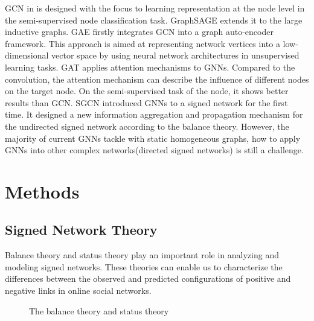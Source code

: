 \documentclass[runningheads]{llncs}
\begin{document}
GCN in\cite{kipf2016semi} is designed with the focus to learning representation at the node level in the semi-supervised node classification task. 
GraphSAGE\cite{hamilton2017inductive} extends it to the large inductive graphs.
GAE\cite{kipf2016variational} firstly integrates GCN into a graph auto-encoder framework. 
This approach is aimed at representing network vertices into a low-dimensional vector space by using neural network architectures in unsupervised learning tasks.
GAT\cite{velickovic2017graph} applies attention mechanisms to GNNs. 
Compared to the convolution, the attention mechanism can describe the influence of different nodes on the target node. 
On the semi-supervised task of the node, it shows better results than GCN.
SGCN\cite{arinik2017signed} introduced GNNs to a signed network for the first time. 
It designed a new information aggregation and propagation mechanism for the undirected signed network according to the balance theory. 
However, the majority of current GNNs tackle with static homogeneous graphs\cite{wu2019comprehensive}, how to apply GNNs into other complex networks(\eg directed signed networks) is still a challenge. 

 
\section{Methods}\label{sec:methods}
\subsection{Signed Network Theory}

Balance theory and status theory play an important role in analyzing and modeling signed networks. 
These theories can enable us to characterize the differences between the observed and predicted configurations of positive and negative links in online social networks\cite{leskovec2010predicting}. 
\begin{figure}[!ht]
    \vspace{-20px}
    \label{fig:1a}
    \label{fig:1b}
    \caption{The balance theory and status theory}
\vspace{-10px}
\end{figure}
\end{document}
